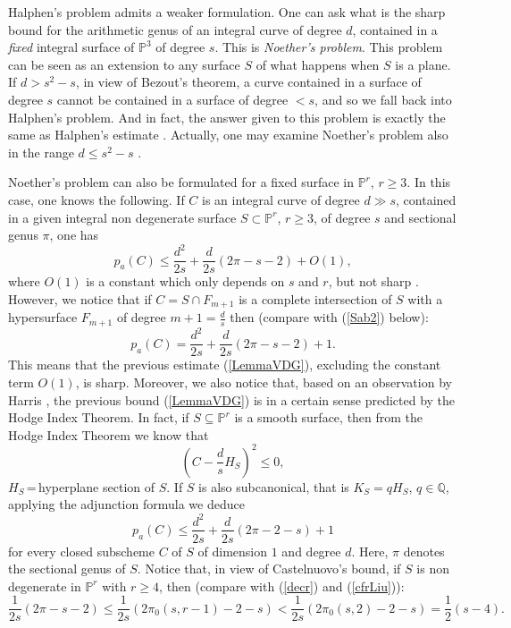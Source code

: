 \documentclass[9pt,a4paper]{amsart}
\theoremstyle{plain}
\theoremstyle{definition}
\theoremstyle{remark}
\begin{document}
\smallskip
Halphen's problem admits a weaker formulation. One can ask what is
the sharp bound for the arithmetic genus of an integral curve of
degree $d$, contained in a {\it fixed} integral surface of $\mathbb
P^3$ of degree $s$. This is {\it Noether's problem}. This problem
can be seen as an extension to any surface $S$ of what happens when
$S$ is a plane. If $d>s^2-s$, in view of Bezout's theorem, a curve
contained in a surface of degree $s$ cannot be contained in a
surface of degree $<s$, and so we fall back into Halphen's problem.
And in fact, the answer given to this problem is exactly the same as
Halphen's estimate \cite{Harris1980}. Actually, one may examine {Noether's
problem} also in the range $d\leq s^2-s$ \cite{Harris1980}.


\smallskip
Noether's problem can also be formulated for a fixed
surface in $\mathbb P^r$, $r\geq 3$. In this case, one knows the
following. If $C$ is an integral curve of degree $d\gg s$, contained
in a given integral non degenerate surface $S\subset \mathbb P^r$, $r\geq 3$, of
degree $s$ and sectional genus $\pi$, one has
\begin{equation}\label{LemmaVDG}
p_a(C)\leq \frac{d^2}{2s}+\frac{d}{2s}(2\pi-s-2)+O(1),
\end{equation}
where $O(1)$ is a constant which only depends on $s$ and $r$, but
not sharp \cite[Lemma]{D3}. However, we notice that if $C=S\cap F_{m+1}$ is a
complete intersection of $S$ with a hypersurface $F_{m+1}$ of degree
$m+1=\frac{d}{s}$ then (compare with (\ref{Sab2}) below):
\begin{equation}\label{boundintcompl}
p_a(C)=\frac{d^2}{2s}+\frac{d}{2s}(2\pi-s-2)+1.
\end{equation}
This means that the previous estimate (\ref{LemmaVDG}), excluding
the constant term $O(1)$, is sharp. Moreover, we also notice that,
based on an observation by Harris \cite[p. 196]{Harris1980}, the previous
bound (\ref{LemmaVDG}) is in a certain sense predicted by the Hodge
Index Theorem. In fact, if $S\subseteq \mathbb P^r$ is a smooth
surface, then from the Hodge Index Theorem we know that
$$\left(C-\frac{d}{s}H_S\right)^2\leq 0,$$
$H_S$\,=\,hyperplane section of $S$. If $S$ is also subcanonical,
that is $K_S=qH_S$, $q\in\mathbb Q$, applying the adjunction formula
we deduce
\begin{equation}\label{HIT}
p_a(C)\leq \frac{d^2}{2s}+\frac{d}{2s}(2\pi-2-s)+1
\end{equation}
for every closed subscheme $C$ of $S$ of dimension $1$ and degree
$d$. Here, $\pi$ denotes the sectional genus of $S$. Notice that, in view of Castelnuovo's bound,
if $S$ is non degenerate in  $\mathbb P^r$ with $r\geq 4$, then (compare with (\ref{decr}) and (\ref{cfrLiu})):
\begin{equation}\label{lessLiu}
\frac{1}{2s}(2\pi-s-2)\leq \frac{1}{2s}(2\pi_0(s,r-1)-2-s)< \frac{1}{2s}(2\pi_0(s,2)-2-s)=\frac{1}{2}(s-4).
\end{equation}
\end{document}

